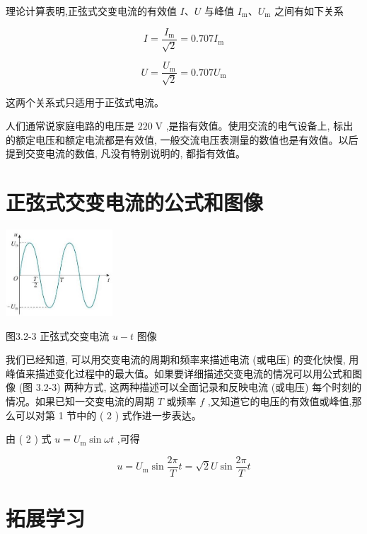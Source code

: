 \documentclass[10pt]{article}
\begin{document}
理论计算表明,正弦式交变电流的有效值 \(I\text{、}U\) 与峰值 \({I}_{\mathrm{m}}\text{、}{U}_{\mathrm{m}}\) 之间有如下关系

\[
I = \frac{{I}_{\mathrm{m}}}{\sqrt{2}} = {0.707}{I}_{\mathrm{m}}
\]

\[
U = \frac{{U}_{\mathrm{m}}}{\sqrt{2}} = {0.707}{U}_{\mathrm{m}}
\]

\begin{mdframed}

这两个关系式只适用于正弦式电流。

\end{mdframed}

人们通常说家庭电路的电压是 \({220}\mathrm{\;V}\) ,是指有效值。使用交流的电气设备上, 标出的额定电压和额定电流都是有效值, 一般交流电压表测量的数值也是有效值。以后提到交变电流的数值, 凡没有特别说明的, 都指有效值。

\section*{正弦式交变电流的公式和图像}

\begin{center}
\includegraphics[max width=0.3\textwidth]{images/01910e72-c5b7-7ed5-a6d4-fb3a5faefc32_61_301527.jpg}
\end{center}

图3.2-3 正弦式交变电流 \(u - t\) 图像

我们已经知道, 可以用交变电流的周期和频率来描述电流 (或电压) 的变化快慢, 用峰值来描述变化过程中的最大值。如果要详细描述交变电流的情况可以用公式和图像 (图 3.2-3) 两种方式, 这两种描述可以全面记录和反映电流 (或电压) 每个时刻的情况。如果已知一交变电流的周期 \(T\) 或频率 \(f\) ,又知道它的电压的有效值或峰值,那么可以对第 1 节中的 ( 2 ) 式作进一步表达。

由 ( 2 ) 式 \(u = {U}_{\mathrm{m}}\sin {\omega t}\) ,可得

\[
u = {U}_{\mathrm{m}}\sin \frac{2\pi }{T}t = \sqrt{2}U\sin \frac{2\pi }{T}t
\]

\section*{拓展学习}
\end{document}
